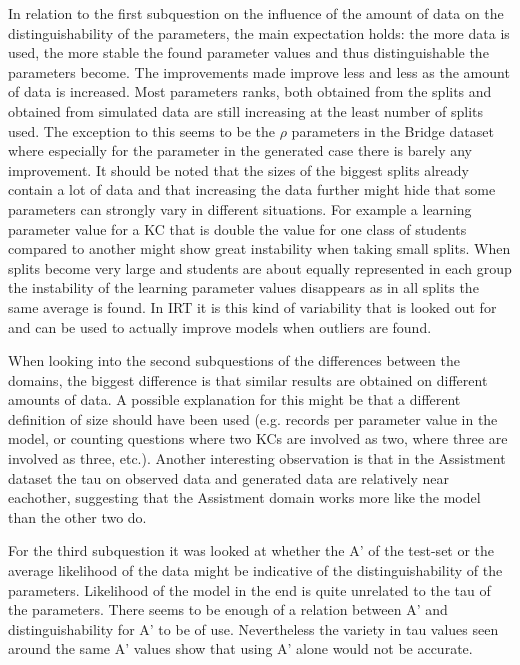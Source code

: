 \documentclass{scrartcl}
\begin{document}
In relation to the first subquestion on the influence of the amount of data on the distinguishability of the parameters, the main expectation holds: the more data is used, the more stable the found parameter values and thus distinguishable the parameters become. The improvements made improve less and less as the amount of data is increased. Most parameters ranks, both obtained from the splits and obtained from simulated data are still increasing at the least number of splits used. The exception to this seems to be the $\rho$ parameters in the Bridge dataset where especially for the parameter in the generated case there is barely any improvement. It should be noted that the sizes of the biggest splits already contain a lot of data and that increasing the data further might hide that some parameters can strongly vary in different situations. For example a learning parameter value for a KC that is double the value for one class of students compared to another might show great instability when taking small splits. When splits become very large and students are about equally represented in each group the instability of the learning parameter values disappears as in all splits the same average is found. In IRT it is this kind of variability that is looked out for and can be used to actually improve models when outliers are found.

When looking into the second subquestions of the differences between the domains, the biggest difference is that similar results are obtained on different amounts of data. A possible explanation for this might be that a different definition of size should have been used (e.g. records per parameter value in the model, or counting questions where two KCs are involved as two, where three are involved as three, etc.). Another interesting observation is that in the Assistment dataset the tau on observed data and generated data are relatively near eachother, suggesting that the Assistment domain works more like the model than the other two do.

For the third subquestion it was looked at whether the A' of the test-set or the average likelihood of the data might be indicative of the distinguishability of the parameters. Likelihood of the model in the end is quite unrelated to the tau of the parameters. There seems to be enough of a relation between A' and distinguishability for A' to be of use. Nevertheless the variety in tau values seen around the same A' values show that using A' alone would not be accurate.
\end{document}
